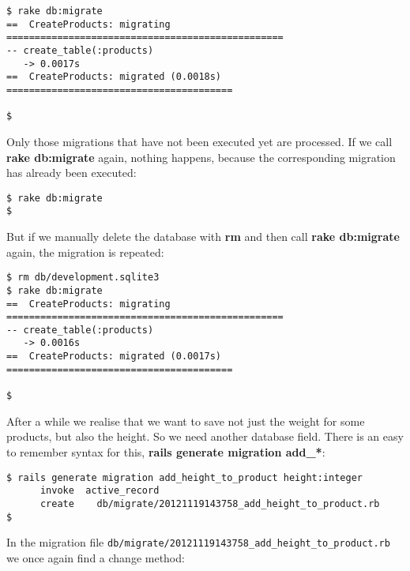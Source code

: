 \documentclass[a4paper]{book}
\newcounter{tab}[chapter]
\begin{document}
\begin{shaded}\begin{verbatim}
$ rake db:migrate
==  CreateProducts: migrating =================================================
-- create_table(:products)
   -> 0.0017s
==  CreateProducts: migrated (0.0018s) ========================================

$
\end{verbatim}\end{shaded}

Only those migrations that have not been executed yet are processed. If we call \textbf{rake db:migrate} again, nothing happens, because the corresponding migration has already been executed:

\begin{shaded}\begin{verbatim}
$ rake db:migrate
$
\end{verbatim}\end{shaded}

But if we manually delete the database with \textbf{rm} and then call \textbf{rake db:migrate} again, the migration is repeated:

\begin{shaded}\begin{verbatim}
$ rm db/development.sqlite3
$ rake db:migrate
==  CreateProducts: migrating =================================================
-- create_table(:products)
   -> 0.0016s
==  CreateProducts: migrated (0.0017s) ========================================

$  
\end{verbatim}\end{shaded}

After a while we realise that we want to save not just the weight for some products, but also the height. So we need another database field. There is an easy to remember syntax for this, \textbf{rails generate migration add\_*}:

\begin{shaded}\begin{verbatim}
$ rails generate migration add_height_to_product height:integer
      invoke  active_record
      create    db/migrate/20121119143758_add_height_to_product.rb
$
\end{verbatim}\end{shaded}

In the migration file \texttt{db/migrate/20121119143758\_add\_height\_to\_product.rb} we once again find a change method:
\end{document}
